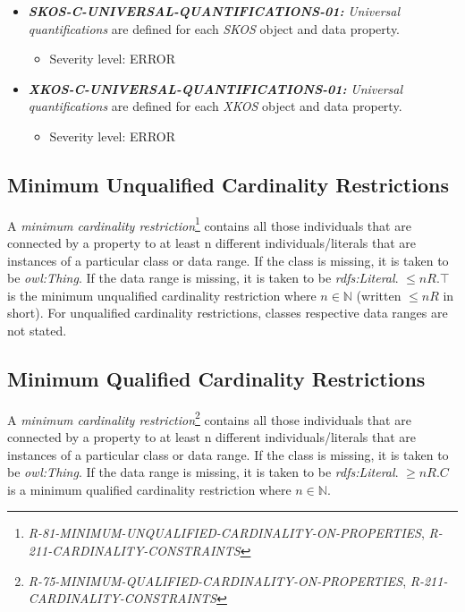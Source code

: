 \documentclass{llncs}
\begin{document}
\begin{itemize}
	\item \textbf{{\em SKOS-C-UNIVERSAL-QUANTIFICATIONS-01:}}
	\emph{Universal quantifications} are defined for each \emph{SKOS} object and data property.
	\begin{itemize}
		\item Severity level: ERROR
	\end{itemize}
\end{itemize}

\begin{itemize}
	\item \textbf{{\em XKOS-C-UNIVERSAL-QUANTIFICATIONS-01:}}
	\emph{Universal quantifications} are defined for each \emph{XKOS} object and data property.
	\begin{itemize}
		\item Severity level: ERROR
	\end{itemize}
\end{itemize}

\subsection{Minimum Unqualified Cardinality Restrictions}

A \emph{minimum cardinality restriction}\footnote{{\em R-81-MINIMUM-UNQUALIFIED-CARDINALITY-ON-PROPERTIES}, {\em R-211-CARDINALITY-CONSTRAINTS}} contains all those individuals that are connected by a property to at least n different individuals/literals 
that are instances of a particular class or data range. If the class is missing, it is taken to be \emph{owl:Thing}. 
If the data range is missing, it is taken to be \emph{rdfs:Literal}.
$\leq n R. \top$ is the minimum unqualified cardinality restriction where $n \in \mathbb{N}$ (written $\leq  n R$ in short).
For unqualified cardinality restrictions, classes respective data ranges are not stated.

\subsection{Minimum Qualified Cardinality Restrictions}

A \emph{minimum cardinality restriction}\footnote{{\em R-75-MINIMUM-QUALIFIED-CARDINALITY-ON-PROPERTIES}, {\em R-211-CARDINALITY-CONSTRAINTS}} contains all those individuals that are connected by a property to at least n different individuals/literals 
that are instances of a particular class or data range. If the class is missing, it is taken to be \emph{owl:Thing}. 
If the data range is missing, it is taken to be \emph{rdfs:Literal}.
$\geq n R. C$ is a minimum qualified cardinality restriction where $n \in \mathbb{N}$.
\end{document}
